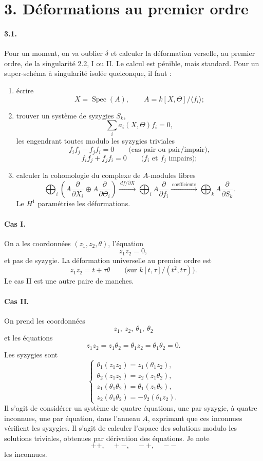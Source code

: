 \documentclass[11pt]{article}
\newcommand{\Spec}{\operatorname{Spec}}
\begin{document}
\section*{3. Déformations au premier ordre}

\paragraph{3.1.}
Pour un moment, on va oublier $\delta$ et calculer la déformation verselle, au premier ordre, de la singularité 2.2, I ou II. Le calcul est pénible, mais standard. Pour un super-schéma à singularité isolée quelconque, il faut :

\begin{enumerate}
\item[(a)] écrire
\[
  X=\Spec(A),\qquad A=k[X,\Theta]/\langle f_i\rangle ;
\]
\item[(b)] trouver un système de syzygies $S_k$,
\[
  \sum_i a_i(X,\Theta)f_i=0,
\]
les engendrant toutes modulo les syzygies triviales
\[
  f_i f_j-f_j f_i=0\qquad\text{(cas pair ou pair/impair)},
\]
\[
  f_i f_j+f_j f_i=0\qquad\text{($f_i$ et $f_j$ impairs)};
\]
\item[(c)] calculer la cohomologie du complexe de $A$-modules libres
\[
  \bigoplus_i\left(A\frac{\partial}{\partial X_i}\oplus
  A\frac{\partial}{\partial\Theta_i}\right)
  \xrightarrow{\ df/\partial X\ }
  \bigoplus_i A\frac{\partial}{\partial f_i}
  \xrightarrow{\ \text{coefficients}\ }
  \bigoplus_k A\frac{\partial}{\partial S_k}.
\]
Le $H^1$ paramétrise les déformations.
\end{enumerate}

\paragraph{Cas I.}
On a les coordonnées $(z_1,z_2,\theta)$, l'équation
\[
  z_1z_2=0,
\]
et pas de syzygie. La déformation universelle au premier ordre est
\[
  z_1z_2=t+\tau\theta
  \qquad\bigl(\text{sur }k[t,\tau]/(t^2,t\tau)\bigr).
\]
Le cas II est une autre paire de manches.

\paragraph{Cas II.}
On prend les coordonnées
\[
  z_1,\ z_2,\ \theta_1,\ \theta_2
\]
et les équations
\[
  z_1z_2=z_1\theta_2=\theta_1z_2=\theta_1\theta_2=0.
\]
Les syzygies sont
\[
\begin{cases}
\theta_1(z_1z_2)=z_1(\theta_1z_2),\\
\theta_2(z_1z_2)=z_2(z_1\theta_2),\\
z_1(\theta_1\theta_2)=\theta_1(z_1\theta_2),\\
z_2(\theta_1\theta_2)=-\theta_2(\theta_1z_2).
\end{cases}
\]
Il s'agit de considérer un système de quatre équations, une par syzygie, à quatre inconnues, une par équation, dans l'anneau $A$, exprimant que ces inconnues vérifient les syzygies. Il s'agit de calculer l'espace des solutions modulo les solutions triviales, obtenues par dérivation des équations. Je note
\[
  ++,\quad +-,\quad -+,\quad --
\]
les inconnues.
\end{document}
